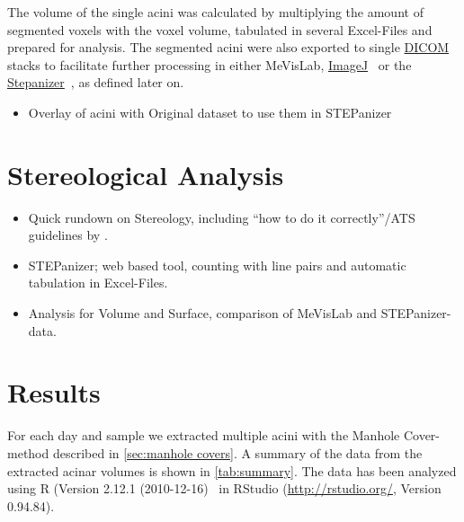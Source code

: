 \documentclass[%
	draft=true,
	paper=a4,%
	twoside=true,%
	abstract=true]{scrartcl}
\newcommand{\todome}[2][]{\todo[color=yellow!62!white, #1]{David: #2}}
\begin{document}
The volume of the single acini was calculated by multiplying the amount of segmented voxels with the voxel volume, tabulated in several Excel-Files and prepared for analysis. The segmented acini were also exported to single \href{https://secure.wikimedia.org/wikipedia/en/w/index.php?title=Digital_Imaging_and_Communications_in_Medicine&oldid=415023605}{DICOM} stacks to facilitate further processing in either MeVisLab, \href{http://rsbweb.nih.gov/ij/}{ImageJ}~\cite{Abramoff2004} or the \href{http://stepanizer.com/}{Stepanizer}~\cite{Tschanz2011}, as defined later on.

\begin{itemize}
	\item Overlay of acini with Original dataset to use them in STEPanizer
\end{itemize}

\section{Stereological Analysis}
\begin{itemize}
	\item Quick rundown on Stereology, including “how to do it correctly”/ATS guidelines by \citet{Hsia2010}.
	\item STEPanizer; web based tool, counting with line pairs and automatic tabulation in Excel-Files.
	\item Analysis for Volume and Surface, comparison of MeVisLab and STEPanizer-data.
\end{itemize}

\section{Results}\label{sec:Results}
For each day and sample we extracted multiple \todome{how many exactly?} acini with the Manhole Cover-method described in \autoref{sec:manhole covers}. A summary of the data from the extracted acinar volumes is shown in \autoref{tab:summary}. The data has been analyzed using R (Version 2.12.1 (2010-12-16)~\cite{R} in RStudio (\url{http://rstudio.org/}, Version 0.94.84). 

 
\end{document}
